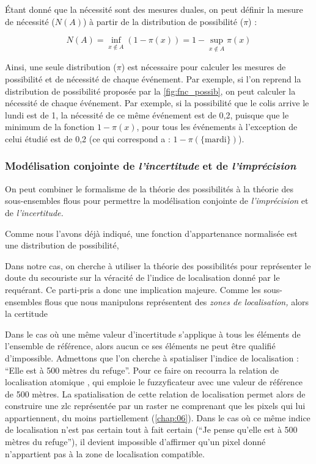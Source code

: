 Étant donné que la nécessité sont des mesures duales, on peut définir
la mesure de nécessité (\(N(A)\)) à partir de la distribution de
possibilité (\(π\)) :

\begin{equation}
  N(A) = \inf_{x ∉ A}(1-π(x)) = 1 - \sup_{x ∉ A}π(x)
\end{equation}

Ainsi, une seule distribution (\(\pi\)) est nécessaire pour calculer
les mesures de possibilité et de nécessité de chaque événement. Par
exemple, si l'on reprend la distribution de possibilité proposée par
la \autoref{fig:fnc_possib}, on peut calculer la nécessité de chaque
événement. Par exemple, si la possibilité que le colis arrive le lundi
est de 1, la nécessité de ce même événement est de 0,2, puisque que le
minimum de la fonction \(1-π(x)\), pour tous les événements à
l'exception de celui étudié est de 0,2 (ce qui correspond a :
\(1-π(\{\text{mardi}\})\)).

\subsubsection{Modélisation conjointe de \emph{l'incertitude} et de
  \emph{l'imprécision}}

On peut combiner le formalisme de la théorie des possibilités à la
théorie des sous-ensembles flous pour permettre la modélisation
conjointe de \emph{l'imprécision} et de \emph{l'incertitude.}



Comme nous l'avons déjà indiqué, une fonction d'appartenance
normalisée est une distribution de possibilité,

Dans notre cas, on cherche à utiliser la théorie des possibilités pour
représenter le doute du secouriste sur la véracité de l'indice de
localisation donné par le requérant. Ce parti-pris a donc une
implication majeure. Comme les sous-ensembles flous que nous
manipulons représentent des \emph{zones de localisation,} alors la
certitude


Dans le cas où une même valeur d'incertitude s'applique à tous les
éléments de l'ensemble de référence, alors aucun ce ses éléments ne
peut être qualifié d'impossible.
%
Admettons que l'on cherche à spatialiser l'indice de localisation :
\enquote{Elle est à 500 mètres du refuge}. Pour ce faire on recourra
la relation de localisation atomique
, qui emploie le fuzzyficateur
 avec une valeur de référence de 500 mètres. La
spatialisation de cette relation de localisation permet alors de
construire une \ac{zlc} représentée par un raster ne comprenant que
les pixels qui lui appartiennent, du moins partiellement
(\autoref{chap:06}). Dans le cas où ce même indice de localisation
n'est pas certain tout à fait certain (\eg \enquote{Je pense qu'elle
  est à 500 mètres du refuge}), il devient impossible d'affirmer qu'un
pixel donné n'appartient pas à la zone de localisation compatible.


